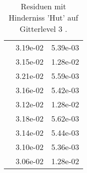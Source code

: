 \begin{table}
\begin{tabular}{c|cc|}
\multicolumn{1}{|c|}{} & \multicolumn{1}{|c|}{  3.19e-02} & \multicolumn{1}{|c|}{  5.39e-03} \\ 
\multicolumn{1}{|c|}{} & \multicolumn{1}{|c|}{  3.15e-02} & \multicolumn{1}{|c|}{  1.28e-02} \\ 
\multicolumn{1}{|c|}{} & \multicolumn{1}{|c|}{  3.21e-02} & \multicolumn{1}{|c|}{  5.59e-03} \\ 
\multicolumn{1}{|c|}{} & \multicolumn{1}{|c|}{  3.16e-02} & \multicolumn{1}{|c|}{  5.42e-03} \\ 
\multicolumn{1}{|c|}{} & \multicolumn{1}{|c|}{  3.12e-02} & \multicolumn{1}{|c|}{  1.28e-02} \\ 
\multicolumn{1}{|c|}{} & \multicolumn{1}{|c|}{  3.18e-02} & \multicolumn{1}{|c|}{  5.62e-03} \\ 
\multicolumn{1}{|c|}{} & \multicolumn{1}{|c|}{  3.14e-02} & \multicolumn{1}{|c|}{  5.44e-03} \\ 
\multicolumn{1}{|c|}{} & \multicolumn{1}{|c|}{  3.10e-02} & \multicolumn{1}{|c|}{  5.36e-03} \\ 
\multicolumn{1}{|c|}{} & \multicolumn{1}{|c|}{  3.06e-02} & \multicolumn{1}{|c|}{  1.28e-02} \\ 
\hline 
\end{tabular}\caption{Residuen mit Hinderniss 'Hut' auf Gitterlevel 3 .}\label{tab:Residuum_Hut_level3}
\end{table} 
